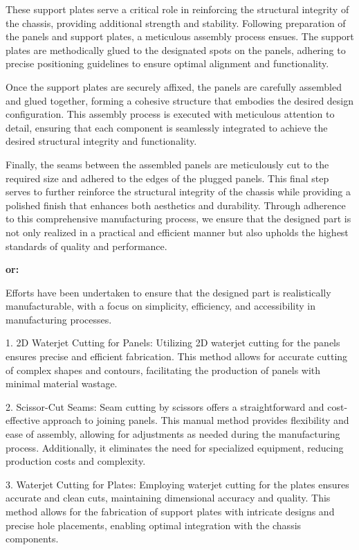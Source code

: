 These support plates serve a critical role in reinforcing the structural integrity of the chassis, providing additional strength and stability. Following preparation of the panels and support plates, a meticulous assembly process ensues. The support plates are methodically glued to the designated spots on the panels, adhering to precise positioning guidelines to ensure optimal alignment and functionality.

Once the support plates are securely affixed, the panels are carefully assembled and glued together, forming a cohesive structure that embodies the desired design configuration. This assembly process is executed with meticulous attention to detail, ensuring that each component is seamlessly integrated to achieve the desired structural integrity and functionality.

Finally, the seams between the assembled panels are meticulously cut to the required size and adhered to the edges of the plugged panels. This final step serves to further reinforce the structural integrity of the chassis while providing a polished finish that enhances both aesthetics and durability. Through adherence to this comprehensive manufacturing process, we ensure that the designed part is not only realized in a practical and efficient manner but also upholds the highest standards of quality and performance.

\textbf{or:}

Efforts have been undertaken to ensure that the designed part is realistically manufacturable, with a focus on simplicity, efficiency, and accessibility in manufacturing processes.

1.	2D Waterjet Cutting for Panels: Utilizing 2D waterjet cutting for the panels ensures precise and efficient fabrication. This method allows for accurate cutting of complex shapes and contours, facilitating the production of panels with minimal material wastage.

2.	Scissor-Cut Seams: Seam cutting by scissors offers a straightforward and cost-effective approach to joining panels. This manual method provides flexibility and ease of assembly, allowing for adjustments as needed during the manufacturing process. Additionally, it eliminates the need for specialized equipment, reducing production costs and complexity.

3.	Waterjet Cutting for Plates: Employing waterjet cutting for the plates ensures accurate and clean cuts, maintaining dimensional accuracy and quality. This method allows for the fabrication of support plates with intricate designs and precise hole placements, enabling optimal integration with the chassis components.

